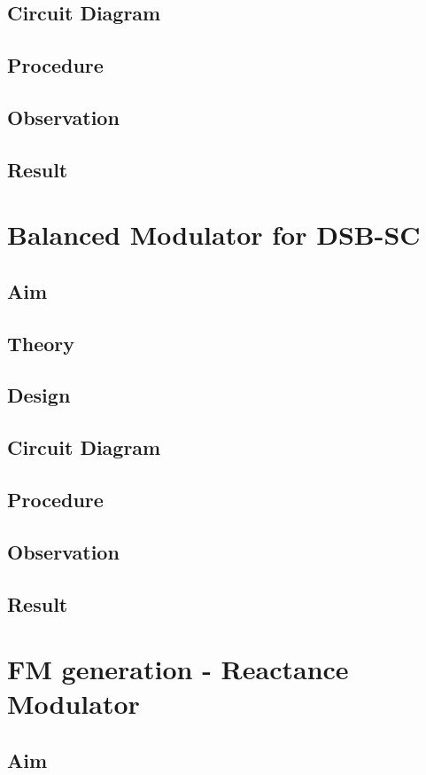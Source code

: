 \documentclass{book}
\begin{document}
\section*{Circuit Diagram}
\section*{Procedure}
\section*{Observation}
\section*{Result}

\chapter[Balanced Modulator for DSB-SC]{Balanced Modulator for DSB-SC}
\section*{Aim}
\section*{Theory}
\section*{Design}
\section*{Circuit Diagram}
\section*{Procedure}
\section*{Observation}
\section*{Result}


\chapter[FM generation - Reactance Modulator]{FM generation - Reactance Modulator}
\section*{Aim}
\end{document}
